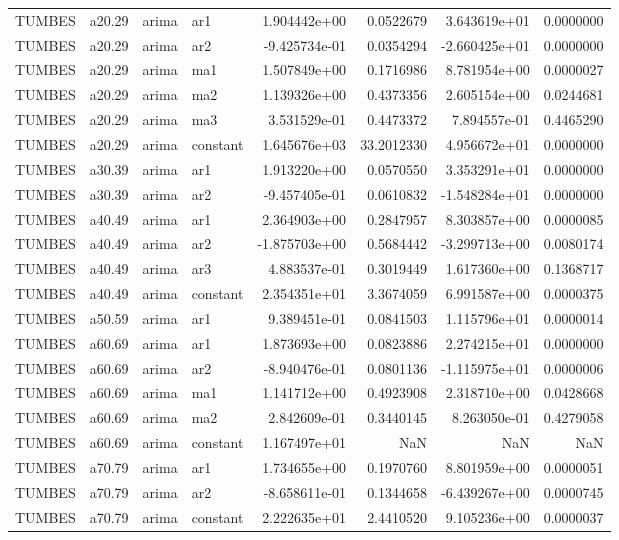 \documentclass[
]{article}
\begin{document}
\begin{table}[!h]
\begin{tabular}[t]{llllrrrr}
TUMBES & a20.29 & arima & ar1 & 1.904442e+00 & 0.0522679 & 3.643619e+01 & 0.0000000\\
TUMBES & a20.29 & arima & ar2 & -9.425734e-01 & 0.0354294 & -2.660425e+01 & 0.0000000\\
TUMBES & a20.29 & arima & ma1 & 1.507849e+00 & 0.1716986 & 8.781954e+00 & 0.0000027\\
TUMBES & a20.29 & arima & ma2 & 1.139326e+00 & 0.4373356 & 2.605154e+00 & 0.0244681\\
\addlinespace
TUMBES & a20.29 & arima & ma3 & 3.531529e-01 & 0.4473372 & 7.894557e-01 & 0.4465290\\
TUMBES & a20.29 & arima & constant & 1.645676e+03 & 33.2012330 & 4.956672e+01 & 0.0000000\\
TUMBES & a30.39 & arima & ar1 & 1.913220e+00 & 0.0570550 & 3.353291e+01 & 0.0000000\\
TUMBES & a30.39 & arima & ar2 & -9.457405e-01 & 0.0610832 & -1.548284e+01 & 0.0000000\\
TUMBES & a40.49 & arima & ar1 & 2.364903e+00 & 0.2847957 & 8.303857e+00 & 0.0000085\\
\addlinespace
TUMBES & a40.49 & arima & ar2 & -1.875703e+00 & 0.5684442 & -3.299713e+00 & 0.0080174\\
TUMBES & a40.49 & arima & ar3 & 4.883537e-01 & 0.3019449 & 1.617360e+00 & 0.1368717\\
TUMBES & a40.49 & arima & constant & 2.354351e+01 & 3.3674059 & 6.991587e+00 & 0.0000375\\
TUMBES & a50.59 & arima & ar1 & 9.389451e-01 & 0.0841503 & 1.115796e+01 & 0.0000014\\
TUMBES & a60.69 & arima & ar1 & 1.873693e+00 & 0.0823886 & 2.274215e+01 & 0.0000000\\
\addlinespace
TUMBES & a60.69 & arima & ar2 & -8.940476e-01 & 0.0801136 & -1.115975e+01 & 0.0000006\\
TUMBES & a60.69 & arima & ma1 & 1.141712e+00 & 0.4923908 & 2.318710e+00 & 0.0428668\\
TUMBES & a60.69 & arima & ma2 & 2.842609e-01 & 0.3440145 & 8.263050e-01 & 0.4279058\\
TUMBES & a60.69 & arima & constant & 1.167497e+01 & NaN & NaN & NaN\\
TUMBES & a70.79 & arima & ar1 & 1.734655e+00 & 0.1970760 & 8.801959e+00 & 0.0000051\\
\addlinespace
TUMBES & a70.79 & arima & ar2 & -8.658611e-01 & 0.1344658 & -6.439267e+00 & 0.0000745\\
TUMBES & a70.79 & arima & constant & 2.222635e+01 & 2.4410520 & 9.105236e+00 & 0.0000037\\

\end{tabular}
\end{table}
\end{document}
